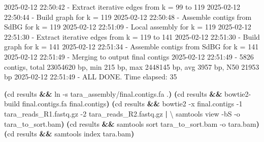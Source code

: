 \documentclass[
  letterpaper,
  DIV=11,
  numbers=noendperiod]{scrartcl}
\newenvironment{Shaded}{\begin{snugshade}}{\end{snugshade}}
\newcommand{\AttributeTok}[1]{\textcolor[rgb]{0.40,0.45,0.13}{#1}}
\newcommand{\BuiltInTok}[1]{\textcolor[rgb]{0.00,0.23,0.31}{#1}}
\newcommand{\DataTypeTok}[1]{\textcolor[rgb]{0.68,0.00,0.00}{#1}}
\newcommand{\ExtensionTok}[1]{\textcolor[rgb]{0.00,0.23,0.31}{#1}}
\newcommand{\FunctionTok}[1]{\textcolor[rgb]{0.28,0.35,0.67}{#1}}
\newcommand{\KeywordTok}[1]{\textcolor[rgb]{0.00,0.23,0.31}{\textbf{#1}}}
\newcommand{\NormalTok}[1]{\textcolor[rgb]{0.00,0.23,0.31}{#1}}
\begin{document}
\begin{Shaded}
\begin{Highlighting}[]
\ExtensionTok{2025{-}02{-}12}\NormalTok{ 22:50:42 }\AttributeTok{{-}}\NormalTok{ Extract iterative edges from k = 99 to 119 }
\ExtensionTok{2025{-}02{-}12}\NormalTok{ 22:50:44 }\AttributeTok{{-}}\NormalTok{ Build graph for k = 119 }
\ExtensionTok{2025{-}02{-}12}\NormalTok{ 22:50:48 }\AttributeTok{{-}}\NormalTok{ Assemble contigs from SdBG for k = 119}
\ExtensionTok{2025{-}02{-}12}\NormalTok{ 22:51:09 }\AttributeTok{{-}}\NormalTok{ Local assembly for k = 119}
\ExtensionTok{2025{-}02{-}12}\NormalTok{ 22:51:30 }\AttributeTok{{-}}\NormalTok{ Extract iterative edges from k = 119 to 141 }
\ExtensionTok{2025{-}02{-}12}\NormalTok{ 22:51:30 }\AttributeTok{{-}}\NormalTok{ Build graph for k = 141 }
\ExtensionTok{2025{-}02{-}12}\NormalTok{ 22:51:34 }\AttributeTok{{-}}\NormalTok{ Assemble contigs from SdBG for k = 141}
\ExtensionTok{2025{-}02{-}12}\NormalTok{ 22:51:49 }\AttributeTok{{-}}\NormalTok{ Merging to output final contigs }
\ExtensionTok{2025{-}02{-}12}\NormalTok{ 22:51:49 }\AttributeTok{{-}}\NormalTok{ 5826 contigs, total 23054620 bp, min 215 bp, max 2448145 bp, avg 3957 bp, N50 21953 bp}
\ExtensionTok{2025{-}02{-}12}\NormalTok{ 22:51:49 }\AttributeTok{{-}}\NormalTok{ ALL DONE. Time elapsed: 35}
\end{Highlighting}
\end{Shaded}

\begin{Shaded}
\begin{Highlighting}[]
\KeywordTok{(}\BuiltInTok{cd}\NormalTok{ results }\KeywordTok{\&\&} \FunctionTok{ln} \AttributeTok{{-}s}\NormalTok{ tara\_assembly/final.contigs.fa .}\KeywordTok{)}
\KeywordTok{(}\BuiltInTok{cd}\NormalTok{ results }\KeywordTok{\&\&} \ExtensionTok{bowtie2{-}build}\NormalTok{ final.contigs.fa final.contigs}\KeywordTok{)}
\KeywordTok{(}\BuiltInTok{cd}\NormalTok{ results }\KeywordTok{\&\&} \ExtensionTok{bowtie2} \AttributeTok{{-}x}\NormalTok{ final.contigs }\AttributeTok{{-}1}\NormalTok{ tara\_reads\_R1.fastq.gz }\AttributeTok{{-}2}\NormalTok{ tara\_reads\_R2.fastq.gz }\KeywordTok{|} \DataTypeTok{\textbackslash{}}
    \ExtensionTok{samtools}\NormalTok{ view }\AttributeTok{{-}bS} \AttributeTok{{-}o}\NormalTok{ tara\_to\_sort.bam}\KeywordTok{)}
\KeywordTok{(}\BuiltInTok{cd}\NormalTok{ results }\KeywordTok{\&\&} \ExtensionTok{samtools}\NormalTok{ sort tara\_to\_sort.bam }\AttributeTok{{-}o}\NormalTok{ tara.bam}\KeywordTok{)}
\KeywordTok{(}\BuiltInTok{cd}\NormalTok{ results }\KeywordTok{\&\&} \ExtensionTok{samtools}\NormalTok{ index tara.bam}\KeywordTok{)}
\end{Highlighting}
\end{Shaded}
\end{document}

